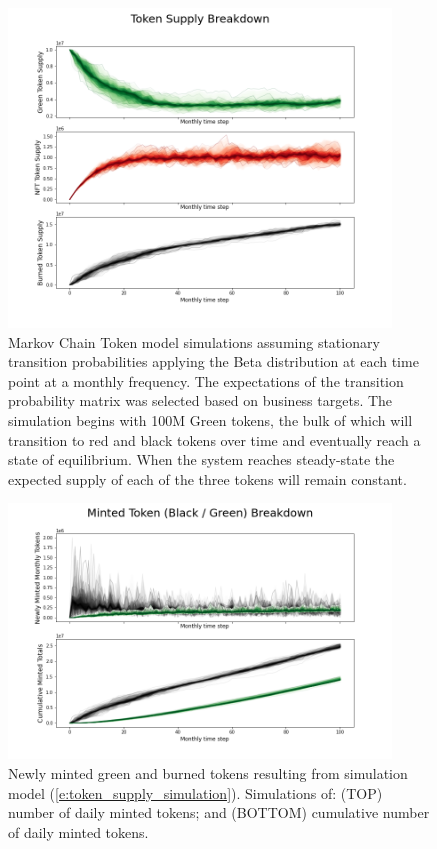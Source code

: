 \documentclass{article}
\begin{document}
\begin{figure}
\centering
\includegraphics[width=4in]{token_supply_sims.png}
\caption{Markov Chain Token model simulations assuming stationary transition probabilities applying the Beta distribution at each time point at a monthly frequency. The expectations of the transition probability matrix was selected based on business targets. The simulation begins with 100M Green tokens, the bulk of which will transition to red and black tokens over time and eventually reach a state of equilibrium. When the system reaches steady-state the expected supply of each of the three tokens will remain constant.} 
\label{fig:token_supply_sims}
\end{figure} 

\begin{figure}
\centering
\includegraphics[width=4in]{burned_minted.png}
\caption{Newly minted green and burned tokens resulting from simulation model (\ref{e:token_supply_simulation}). Simulations of: (TOP) number of daily minted tokens; and (BOTTOM) cumulative number of daily minted tokens.} 
\label{fig:burned_minted}
\end{figure} 
\end{document}
